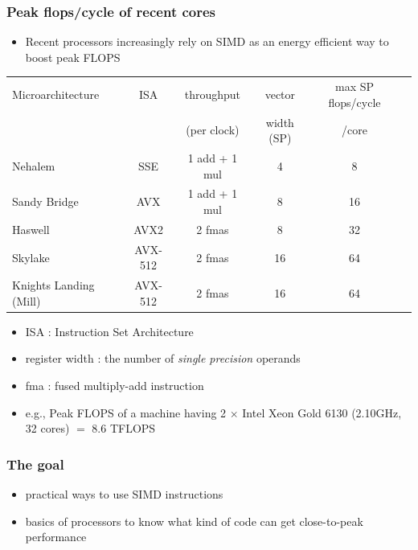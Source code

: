 \documentclass[12pt,dvipdfmx]{beamer}
\newcommand{\ao}[1]{{\color{blue}#1}}
\begin{document}
\begin{frame}
\frametitle{Peak flops/cycle of recent cores}

\begin{itemize}
\item Recent processors increasingly rely on SIMD
  as an energy efficient way to boost peak FLOPS
\end{itemize}

\begin{center}
{\scriptsize
\begin{tabular}{|l|c|c|c|c|c|}\hline
Microarchitecture & ISA    & throughput    & vector   & max SP flops/cycle \\
                  &        & (per clock)   & width (SP) & /core          \\
\hline
Nehalem           & SSE     & 1 add + 1 mul & 4     & 8  \\
Sandy Bridge      & AVX     & 1 add + 1 mul & 8     & 16 \\
Haswell           & AVX2    & 2 fmas        & 8     & 32 \\
\ao{Skylake}      & AVX-512 & 2 fmas        & 16    & 64 \\
\ao{Knights Landing (Mill)} & AVX-512       & 2 fmas & 16    & 64 \\
\hline
\end{tabular}
}
\end{center}

\begin{itemize}
\item ISA : Instruction Set Architecture
\item register width : the number of \ao{\em single precision} operands 
\item fma : fused multiply-add instruction
\item e.g.,
  Peak FLOPS of a machine having 2 $\times$ Intel Xeon Gold 6130 (2.10GHz, 32 cores) $=$ 8.6 TFLOPS
\end{itemize}
\end{frame}

\begin{frame}
\frametitle{The goal}

\begin{itemize}
\item practical ways to use SIMD instructions
\item basics of processors to know
  what kind of code can get close-to-peak performance
\end{itemize}

\end{frame}
\fi
\end{document}
